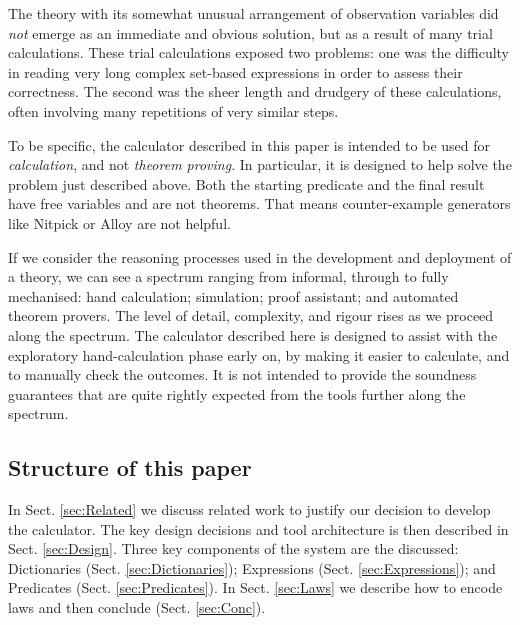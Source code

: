The theory with its somewhat unusual arrangement of observation variables
did \emph{not} emerge as an immediate and obvious solution,
but as a result of many trial calculations.
These trial calculations exposed two problems:
one was the difficulty in reading very long complex
set-based expressions in order to assess their correctness.
The second was the sheer length and drudgery of these calculations,
often involving many repetitions of very similar steps.

To be specific, the calculator described in this paper
is intended to be used for \emph{calculation}, and not \emph{theorem proving}.
In particular, it is designed to help solve the problem
just described above.
Both the starting predicate and the final result have free variables
and are not theorems.
That means counter-example generators
like Nitpick or Alloy 
are not helpful.


If we consider the reasoning processes used in the development
and deployment of a theory, we can see a spectrum ranging from informal,
through to fully mechanised: hand calculation; simulation; proof assistant;
and automated theorem provers.
The level of detail, complexity, and rigour rises as we proceed along the spectrum.
The calculator described here is designed
to assist with the exploratory hand-calculation phase early on,
by making it easier to calculate, and to manually check the outcomes.
It is not intended to provide the soundness guarantees that are quite rightly
expected from the tools further along the spectrum.


\subsection{Structure of this paper}

In Sect. \ref{sec:Related} we discuss related work
to justify our decision to develop the calculator.
The key design decisions and tool architecture is then described
in Sect. \ref{sec:Design}.
Three key components of the system are the discussed:
Dictionaries (Sect. \ref{sec:Dictionaries});
Expressions (Sect. \ref{sec:Expressions}); and
Predicates (Sect. \ref{sec:Predicates}).
In Sect. \ref{sec:Laws} we describe how to encode laws
and then conclude (Sect. \ref{sec:Conc}).
